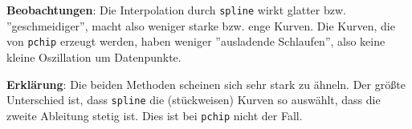 \documentclass[11pt,a4paper,ngerman]{article}
\begin{document}
\textbf{Beobachtungen}: Die Interpolation durch \texttt{spline} wirkt glatter bzw. ''geschmeidiger'',
macht also weniger starke bzw. enge Kurven. Die Kurven, die von \texttt{pchip} erzeugt werden, haben
weniger ''ausladende Schlaufen'', also keine kleine Oszillation um Datenpunkte.

\textbf{Erklärung}: Die beiden Methoden scheinen sich sehr stark zu ähneln. Der größte Unterschied ist,
dass \texttt{spline} die (stückweisen) Kurven so auswählt, dass die zweite Ableitung stetig ist.
Dies ist bei \texttt{pchip} nicht der Fall.
\label{LastPage}
\end{document}
